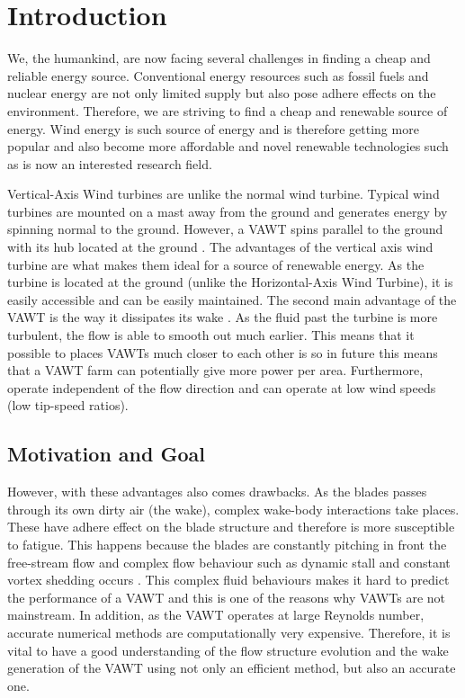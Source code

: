 \chapter{Introduction}
\label{ch:Introduction}

We, the humankind, are now facing several challenges in finding a cheap and reliable energy source. Conventional energy resources such as fossil fuels and nuclear energy are not only limited supply but also pose adhere effects on the environment. Therefore, we are striving to find a cheap and renewable source of energy. Wind energy is such source of energy and is therefore getting more popular and also become more affordable and novel renewable technologies such as  is now an interested research field.\\

Vertical-Axis Wind turbines are unlike the normal wind turbine. Typical wind turbines are mounted on a mast away from the ground and generates energy by spinning normal to the ground. However, a VAWT spins parallel to the ground with its hub located at the ground \cite{website:wikiVAWT}. The advantages of the vertical axis wind turbine are what makes them ideal for a source of renewable energy.  As the turbine is located at the ground (unlike the Horizontal-Axis Wind Turbine), it is easily accessible and can be easily maintained. The second main advantage of the VAWT is the way it dissipates its wake \cite{Ferreira} \cite{Vermeer2003}. As the fluid past the turbine is more turbulent, the flow is able to smooth out much earlier. This means that it possible to places VAWTs much closer to each other is so in future this means that a VAWT farm can potentially give more power per area. Furthermore, operate independent of the flow direction and can operate at low wind speeds (low tip-speed ratios).\\

\section{Motivation and Goal}
However, with these advantages also comes drawbacks. As the blades passes through its own dirty air (the wake), complex wake-body interactions take places. These have adhere effect on the blade structure and therefore is more susceptible to fatigue. This happens because the blades are constantly pitching in front the free-stream flow and complex flow behaviour such as dynamic stall and constant vortex shedding occurs \cite{SimaoFerreira2008}. This complex fluid behaviours makes it hard to predict the performance of a VAWT and this is one of the reasons why VAWTs are not mainstream. In addition, as the VAWT operates at large Reynolds number, accurate numerical methods are computationally very expensive. Therefore, it is vital to have a good understanding of the flow structure evolution and the wake generation of the VAWT using not only an efficient method, but also an accurate one.\\

